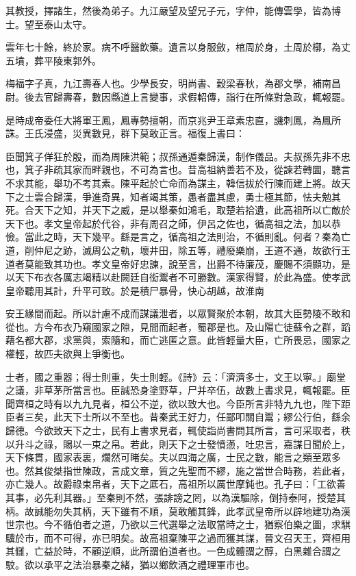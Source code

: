 \begin{pinyinscope}
其教授，擇諸生，然後為弟子。九江嚴望及望兄子元，字仲，能傳雲學，皆為博士。望至泰山太守。

雲年七十餘，終於家。病不呼醫飲藥。遺言以身服斂，棺周於身，土周於槨，為丈五墳，葬平陵東郭外。

梅福字子真，九江壽春人也。少學長安，明尚書、穀梁春秋，為郡文學，補南昌尉。後去官歸壽春，數因縣道上言變事，求假軺傳，詣行在所條對急政，輒報罷。

是時成帝委任大將軍王鳳，鳳專勢擅朝，而京兆尹王章素忠直，譏刺鳳，為鳳所誅。王氏浸盛，災異數見，群下莫敢正言。福復上書曰：

臣聞箕子佯狂於殷，而為周陳洪範；叔孫通遁秦歸漢，制作儀品。夫叔孫先非不忠也，箕子非疏其家而畔親也，不可為言也。昔高祖納善若不及，從諫若轉圜，聽言不求其能，舉功不考其素。陳平起於亡命而為謀主，韓信拔於行陳而建上將。故天下之士雲合歸漢，爭進奇異，知者竭其策，愚者盡其慮，勇士極其節，怯夫勉其死。合天下之知，并天下之威，是以舉秦如鴻毛，取楚若拾遺，此高祖所以亡敵於天下也。孝文皇帝起於代谷，非有周召之師，伊呂之佐也，循高祖之法，加以恭儉。當此之時，天下幾平。繇是言之，循高祖之法則治，不循則亂。何者？秦為亡道，削仲尼之跡，滅周公之軌，壞井田，除五等，禮廢樂崩，王道不通，故欲行王道者莫能致其功也。孝文皇帝好忠諫，說至言，出爵不待廉茂，慶賜不須顯功，是以天下布衣各厲志竭精以赴闕廷自衒鬻者不可勝數。漢家得賢，於此為盛。使孝武皇帝聽用其計，升平可致。於是積尸暴骨，快心胡越，故淮南

安王緣間而起。所以計慮不成而謀議泄者，以眾賢聚於本朝，故其大臣勢陵不敢和從也。方今布衣乃窺國家之隙，見間而起者，蜀郡是也。及山陽亡徒蘇令之群，蹈藉名都大郡，求黨與，索隨和，而亡逃匿之意。此皆輕量大臣，亡所畏忌，國家之權輕，故匹夫欲與上爭衡也。

士者，國之重器；得士則重，失士則輕。《詩》云：「濟濟多士，文王以寧。」廟堂之議，非草茅所當言也。臣誠恐身塗野草，尸并卒伍，故數上書求見，輒報罷。臣聞齊桓之時有以九九見者，桓公不逆，欲以致大也。今臣所言非特九九也，陛下距臣者三矣，此天下士所以不至也。昔秦武王好力，任鄙叩關自鬻；繆公行伯，繇余歸德。今欲致天下之士，民有上書求見者，輒使詣尚書問其所言，言可采取者，秩以升斗之祿，賜以一束之帛。若此，則天下之士發憤懣，吐忠言，嘉謀日聞於上，天下條貫，國家表裏，爛然可睹矣。夫以四海之廣，士民之數，能言之類至眾多也。然其俊桀指世陳政，言成文章，質之先聖而不繆，施之當世合時務，若此者，亦亡幾人。故爵祿束帛者，天下之厎石，高祖所以厲世摩鈍也。孔子曰：「工欲善其事，必先利其器。」至秦則不然，張誹謗之罔，以為漢驅除，倒持泰阿，授楚其柄。故誠能勿失其柄，天下雖有不順，莫敢觸其鋒，此孝武皇帝所以辟地建功為漢世宗也。今不循伯者之道，乃欲以三代選舉之法取當時之士，猶察伯樂之圖，求騏驥於市，而不可得，亦已明矣。故高祖棄陳平之過而獲其謀，晉文召天王，齊桓用其讎，亡益於時，不顧逆順，此所謂伯道者也。一色成體謂之醇，白黑雜合謂之駮。欲以承平之法治暴秦之緒，猶以鄉飲酒之禮理軍市也。


\end{pinyinscope}

